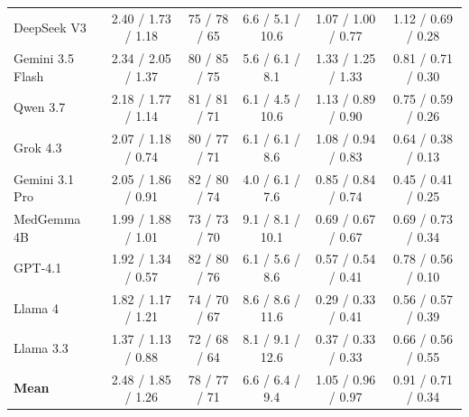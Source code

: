 \begin{table}[ht]
\begin{tabular}{lccccc}
DeepSeek V3 & 2.40 / 1.73 / 1.18 & 75 / 78 / 65 & 6.6 / 5.1 / 10.6 & 1.07 / 1.00 / 0.77 & 1.12 / 0.69 / 0.28 \\
Gemini 3.5 Flash & 2.34 / 2.05 / 1.37 & 80 / 85 / 75 & 5.6 / 6.1 / 8.1 & 1.33 / 1.25 / 1.33 & 0.81 / 0.71 / 0.30 \\
Qwen 3.7 & 2.18 / 1.77 / 1.14 & 81 / 81 / 71 & 6.1 / 4.5 / 10.6 & 1.13 / 0.89 / 0.90 & 0.75 / 0.59 / 0.26 \\
Grok 4.3 & 2.07 / 1.18 / 0.74 & 80 / 77 / 71 & 6.1 / 6.1 / 8.6 & 1.08 / 0.94 / 0.83 & 0.64 / 0.38 / 0.13 \\
Gemini 3.1 Pro & 2.05 / 1.86 / 0.91 & 82 / 80 / 74 & 4.0 / 6.1 / 7.6 & 0.85 / 0.84 / 0.74 & 0.45 / 0.41 / 0.25 \\
MedGemma 4B & 1.99 / 1.88 / 1.01 & 73 / 73 / 70 & 9.1 / 8.1 / 10.1 & 0.69 / 0.67 / 0.67 & 0.69 / 0.73 / 0.34 \\
GPT-4.1 & 1.92 / 1.34 / 0.57 & 82 / 80 / 76 & 6.1 / 5.6 / 8.6 & 0.57 / 0.54 / 0.41 & 0.78 / 0.56 / 0.10 \\
Llama 4 & 1.82 / 1.17 / 1.21 & 74 / 70 / 67 & 8.6 / 8.6 / 11.6 & 0.29 / 0.33 / 0.41 & 0.56 / 0.57 / 0.39 \\
Llama 3.3 & 1.37 / 1.13 / 0.88 & 72 / 68 / 64 & 8.1 / 9.1 / 12.6 & 0.37 / 0.33 / 0.33 & 0.66 / 0.56 / 0.55 \\
\midrule
\textbf{Mean} & 2.48 / 1.85 / 1.26 & 78 / 77 / 71 & 6.6 / 6.4 / 9.4 & 1.05 / 0.96 / 0.97 & 0.91 / 0.71 / 0.34 \\
\bottomrule
\end{tabular}
\end{table}
